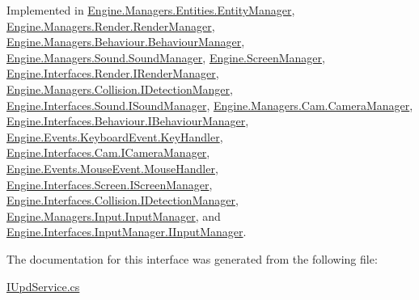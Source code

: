 Implemented in \hyperlink{a00518_a386e96f9edb12689118de624c559de0f}{Engine.\+Managers.\+Entities.\+Entity\+Manager}, \hyperlink{a00526_a7b63b947d986ab05b66c4c9f78ee3c20}{Engine.\+Managers.\+Render.\+Render\+Manager}, \hyperlink{a00486_a729bf10d2469de0497d75dfadbf56506}{Engine.\+Managers.\+Behaviour.\+Behaviour\+Manager}, \hyperlink{a00546_a43e47a47daa91f3b1d0f38b3dcb0323e}{Engine.\+Managers.\+Sound.\+Sound\+Manager}, \hyperlink{a00538_a9abaa968b161ebb2b84c7a47ada52f90}{Engine.\+Screen\+Manager}, \hyperlink{a00458_a99572d9e2280e1d7c21c002255ffe201}{Engine.\+Interfaces.\+Render.\+I\+Render\+Manager}, \hyperlink{a00502_ac032340610657f865bdd3b7a82e316c3}{Engine.\+Managers.\+Collision.\+I\+Detection\+Manger}, \hyperlink{a00482_af7ddcb52a6283aa2cf4392c75d2a0cff}{Engine.\+Interfaces.\+Sound.\+I\+Sound\+Manager}, \hyperlink{a00494_a43e367859b47354445da2a304eff7ec4}{Engine.\+Managers.\+Cam.\+Camera\+Manager}, \hyperlink{a00418_af161090c055167e2ca3901ed13d3d128}{Engine.\+Interfaces.\+Behaviour.\+I\+Behaviour\+Manager}, \hyperlink{a00366_a9eb55c55451fa39922f71469f18683ab}{Engine.\+Events.\+Keyboard\+Event.\+Key\+Handler}, \hyperlink{a00422_a78a46559249e70181100daff38ef5d6a}{Engine.\+Interfaces.\+Cam.\+I\+Camera\+Manager}, \hyperlink{a00378_ad6c588c046d6a350498fd7875416a151}{Engine.\+Events.\+Mouse\+Event.\+Mouse\+Handler}, \hyperlink{a00470_afc42708b653397ca8a3a81dc8d244c61}{Engine.\+Interfaces.\+Screen.\+I\+Screen\+Manager}, \hyperlink{a00430_aeaa36b46e3ecd301b2fce9197fb0a35c}{Engine.\+Interfaces.\+Collision.\+I\+Detection\+Manager}, \hyperlink{a00522_a7b0666f02640f9234e290938c4474e26}{Engine.\+Managers.\+Input.\+Input\+Manager}, and \hyperlink{a00450_a43c99a0052fd196583700113cd0bdf9f}{Engine.\+Interfaces.\+Input\+Manager.\+I\+Input\+Manager}.



The documentation for this interface was generated from the following file\+:\begin{DoxyCompactItemize}
\item 
\hyperlink{a00140}{I\+Upd\+Service.\+cs}\end{DoxyCompactItemize}
